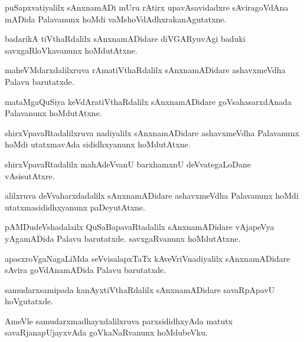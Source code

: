 \documentclass{article}
\begin{document}
\begin{mn}
puSapxvatiyalilx sAnxnamADi mUru rAtirx upavAsavidadxre sAviragoVdAna mADida Palavanunx hoMdi 
vaMshoVdAdhxrakanAgutatxne.
\end{mn}

\begin{mn}
badarikA tiVthaRdalilx sAnxnamADidare diVGARyuvAgi baduki savxgaRloVkavanunx hoMdutAtxne.
\end{mn}

\begin{mn}
maheVMdarxdalilxruva rAmatiVthaRdalilx sAnxnamADidare ashavxmeVdha Palavu barutatxde.
\end{mn}

\begin{mn}
mataMgaQuSiya keVdAratiVthaRdalilx sAnxnamADidare goVsahasarxdAnada Palavanunx hoMdutAtxne.
\end{mn}

\begin{mn}
shirxVpavaRtadalilxruva nadiyalilx sAnxnamADidare ashavxmeVdha Palavanunx hoMdi utatxmavAda 
sididhxyanunx hoMdutAtxne.
\end{mn}

\begin{mn}
shirxVpavaRtadalilx mahAdeVvanU barxhamxnU deVvategaLoDane vAsisutAtxre.
\end{mn}

\begin{mn}
alilxruva deVvaharxdadalilx sAnxnamADidare ashavxmeVdha Palavanunx hoMdi utatxmasididhxyanunx 
paDeyutAtxne.
\end{mn}

\begin{mn}
pAMDudeVshadalailx QuSaBapavaRtadalilx sAnxnamADidare vAjapeVya yAgamADida Palavu barutatxde. 
savxgaRvanunx hoMdutAtxne.
\end{mn}

\begin{mn}
apasxroVgaNagaLiMda seVvisalapxTaTx kAveVriVnadiyalilx sAnxnamADidare sAvira goVdAnamADida Palavu 
barutatxde.
\end{mn}

\begin{mn}
samudarxsamipada  kanAyxtiVthaRdalilx  sAnxnamADidare savaRpApavU hoVgutatxde.
\end{mn}

\begin{mn}
AmeVle samudarxmadhayxdalilxruva parxsididhxyAda matutx savaRjanapUjayxvAda goVkaNaRvanunx 
hoMdubeVku.
\end{mn}
\end{document}
